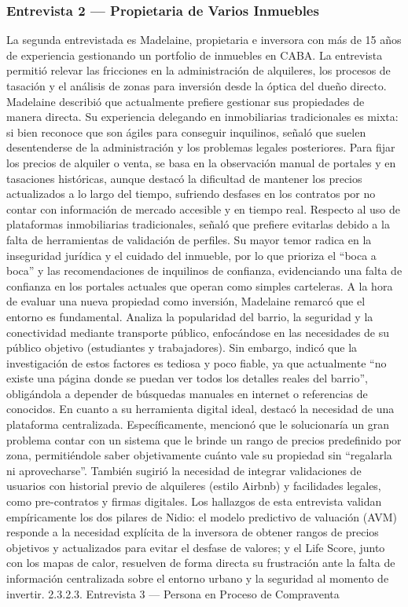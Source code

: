 \subsubsection{Entrevista 2 --- Propietaria de Varios Inmuebles}

La segunda entrevistada es Madelaine, propietaria e inversora con más de 15 años de experiencia gestionando un portfolio de inmuebles en CABA. La entrevista permitió relevar las fricciones en la administración de alquileres, los procesos de tasación y el análisis de zonas para inversión desde la óptica del dueño directo. Madelaine describió que actualmente prefiere gestionar sus propiedades de manera directa. Su experiencia delegando en inmobiliarias tradicionales es mixta: si bien reconoce que son ágiles para conseguir inquilinos, señaló que suelen desentenderse de la administración y los problemas legales posteriores. Para fijar los precios de alquiler o venta, se basa en la observación manual de portales y en tasaciones históricas, aunque destacó la dificultad de mantener los precios actualizados a lo largo del tiempo, sufriendo desfases en los contratos por no contar con información de mercado accesible y en tiempo real. Respecto al uso de plataformas inmobiliarias tradicionales, señaló que prefiere evitarlas debido a la falta de herramientas de validación de perfiles. Su mayor temor radica en la inseguridad jurídica y el cuidado del inmueble, por lo que prioriza el ``boca a boca'' y las recomendaciones de inquilinos de confianza, evidenciando una falta de confianza en los portales actuales que operan como simples carteleras. A la hora de evaluar una nueva propiedad como inversión, Madelaine remarcó que el entorno es fundamental. Analiza la popularidad del barrio, la seguridad y la conectividad mediante transporte público, enfocándose en las necesidades de su público objetivo (estudiantes y trabajadores). Sin embargo, indicó que la investigación de estos factores es tediosa y poco fiable, ya que actualmente ``no existe una página donde se puedan ver todos los detalles reales del barrio'', obligándola a depender de búsquedas manuales en internet o referencias de conocidos. En cuanto a su herramienta digital ideal, destacó la necesidad de una plataforma centralizada. Específicamente, mencionó que le solucionaría un gran problema contar con un sistema que le brinde un rango de precios predefinido por zona, permitiéndole saber objetivamente cuánto vale su propiedad sin ``regalarla ni aprovecharse''. También sugirió la necesidad de integrar validaciones de usuarios con historial previo de alquileres (estilo Airbnb) y facilidades legales, como pre-contratos y firmas digitales. Los hallazgos de esta entrevista validan empíricamente los dos pilares de Nidio: el modelo predictivo de valuación (AVM) responde a la necesidad explícita de la inversora de obtener rangos de precios objetivos y actualizados para evitar el desfase de valores; y el Life Score, junto con los mapas de calor, resuelven de forma directa su frustración ante la falta de información centralizada sobre el entorno urbano y la seguridad al momento de invertir. 2.3.2.3. Entrevista 3 --- Persona en Proceso de Compraventa

